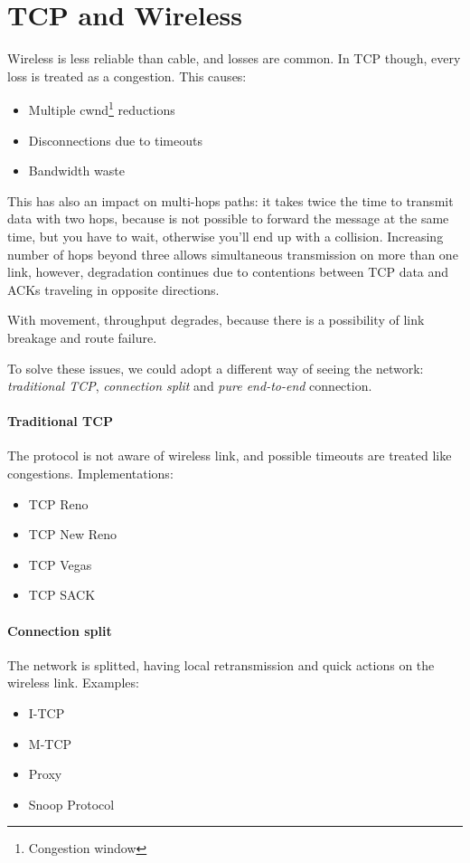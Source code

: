 \section{TCP and Wireless}

Wireless is less reliable than cable, and losses are common. In TCP though,
every loss is treated as a congestion. This causes:
\begin{itemize}
\item Multiple cwnd\footnote{Congestion window} reductions
\item Disconnections due to timeouts
\item Bandwidth waste
\end{itemize}

This has also an impact on multi-hops paths: it takes twice the time to
transmit data with two hops, because is not possible to forward the message at
the same time, but you have to wait, otherwise you'll end up with a collision.
Increasing number of hops beyond three allows simultaneous transmission on more
than one link, however, degradation continues due to contentions between TCP
data and ACKs traveling in opposite directions.

With movement, throughput degrades, because there is a possibility of link
breakage and route failure.

To solve these issues, we could adopt a different way of seeing the network:
\textit{traditional TCP}, \textit{connection split} and
\textit{pure end-to-end} connection.

\paragraph*{Traditional TCP} The protocol is not aware of wireless link, and
possible timeouts are treated like congestions. Implementations:
\begin{itemize}
\item TCP Reno
\item TCP New Reno
\item TCP Vegas
\item TCP SACK
\end{itemize}

\paragraph*{Connection split} The network is splitted, having local
retransmission and quick actions on the wireless link.
Examples:
\begin{itemize}
\item I-TCP
\item M-TCP
\item Proxy
\item Snoop Protocol
\end{itemize}

